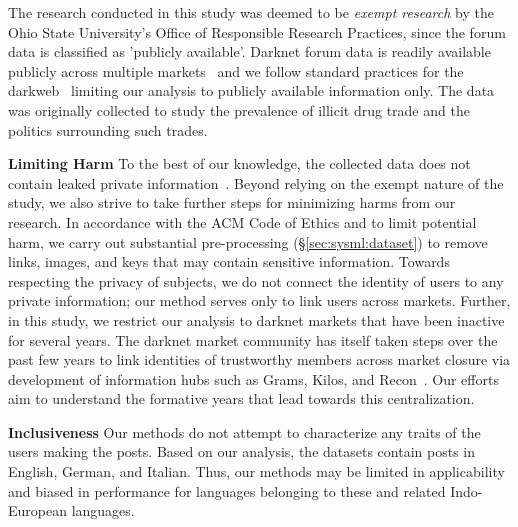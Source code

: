 \label{sec:sysml:ethics}
The research conducted in this study was deemed to be {\it exempt research} by the Ohio State University's Office of Responsible Research Practices, since the forum data is classified as 'publicly available'. 
Darknet forum data is readily available publicly across multiple markets~\cite{dnmArchives,munksgaard2016mixing} and we follow standard practices for the darkweb~\cite{kumar2020edarkfind} limiting our analysis to publicly available information only. 
The data was originally collected to study the prevalence of illicit drug trade and the politics surrounding such trades.


\noindent \textbf{Limiting Harm} To the best of our knowledge, the collected data does not contain leaked private information~\cite{munksgaard2016mixing}. Beyond relying on the exempt nature of the study, we also strive to take further steps for minimizing harms from our research.
In accordance with the ACM Code of Ethics and to limit potential harm, we carry out substantial pre-processing (\S\ref{sec:sysml:dataset}) to remove links, images, and keys that may contain sensitive information.  
Towards respecting the privacy of subjects, we do not connect the identity of users to any private information; our method serves only to link users across markets.
Further, in this study, we restrict our analysis to darknet markets that have been inactive for several years. 
The darknet market community has itself taken steps over the past few years to link identities of trustworthy members across market closure via development of information hubs such as Grams, Kilos, and Recon~\cite{broadhurst2021impact}. 
Our efforts aim to understand the formative years that lead towards this centralization.

\noindent \textbf{Inclusiveness} Our methods do not attempt to characterize any traits of the users making the posts. Based on our analysis, the datasets contain posts in English, German, and Italian. 
Thus, our methods may be limited in applicability and biased in performance for languages belonging to these and related Indo-European languages.  

